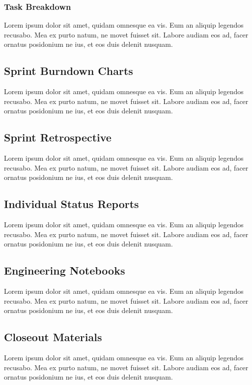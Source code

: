 \subsubsection{Task Breakdown}
Lorem ipsum dolor sit amet, quidam omnesque ea vis. Eum an aliquip legendos recusabo. Mea ex purto natum, ne movet fuisset sit. Labore audiam eos ad, facer ornatus posidonium ne ius, et eos duis delenit nusquam.

\subsection{Sprint Burndown Charts}
Lorem ipsum dolor sit amet, quidam omnesque ea vis. Eum an aliquip legendos recusabo. Mea ex purto natum, ne movet fuisset sit. Labore audiam eos ad, facer ornatus posidonium ne ius, et eos duis delenit nusquam.


\subsection{Sprint Retrospective}
Lorem ipsum dolor sit amet, quidam omnesque ea vis. Eum an aliquip legendos recusabo. Mea ex purto natum, ne movet fuisset sit. Labore audiam eos ad, facer ornatus posidonium ne ius, et eos duis delenit nusquam.

\subsection{Individual Status Reports}
Lorem ipsum dolor sit amet, quidam omnesque ea vis. Eum an aliquip legendos recusabo. Mea ex purto natum, ne movet fuisset sit. Labore audiam eos ad, facer ornatus posidonium ne ius, et eos duis delenit nusquam.

\subsection{Engineering Notebooks}
Lorem ipsum dolor sit amet, quidam omnesque ea vis. Eum an aliquip legendos recusabo. Mea ex purto natum, ne movet fuisset sit. Labore audiam eos ad, facer ornatus posidonium ne ius, et eos duis delenit nusquam.

\subsection{Closeout Materials}
Lorem ipsum dolor sit amet, quidam omnesque ea vis. Eum an aliquip legendos recusabo. Mea ex purto natum, ne movet fuisset sit. Labore audiam eos ad, facer ornatus posidonium ne ius, et eos duis delenit nusquam.

